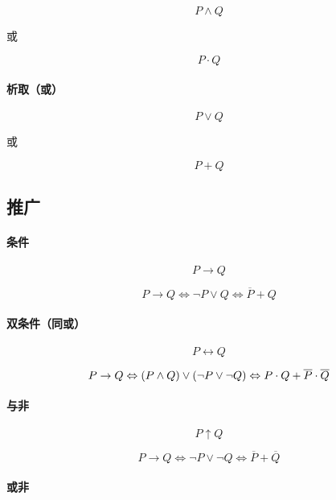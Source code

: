 \documentclass{article}
\begin{document}
\[P\wedge Q\]

或

\[P\cdot Q\]

\paragraph{析取（或）}

\[P\vee Q\]

或

\[P+Q\]

\subsection{推广}

\paragraph{条件}

\[P\rightarrow Q\]

\begin{definition}
    \[P\rightarrow Q
        \Leftrightarrow\neg P \vee Q
        \Leftrightarrow\overline P+Q\]
\end{definition}

\paragraph{双条件（同或）}

\[P\leftrightarrow Q\]

\begin{definition}
    \[P\rightarrow Q
        \Leftrightarrow\left(P\wedge Q\right)\vee\left(\neg P \vee\neg Q\right)
        \Leftrightarrow P\cdot Q+\overline P\cdot \overline Q\]
\end{definition}

\paragraph{与非}

\[P\uparrow Q\]

\begin{definition}
    \[P\rightarrow Q
        \Leftrightarrow\neg P \vee\neg Q
        \Leftrightarrow\overline P+\overline Q\]
\end{definition}

\paragraph{或非}
\end{document}
